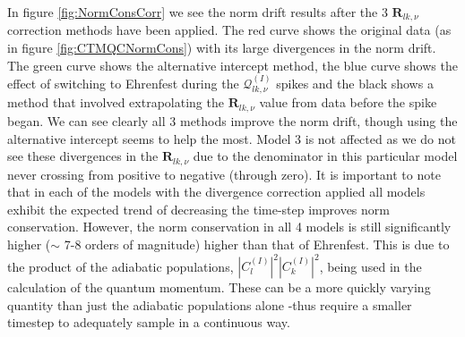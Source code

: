 In figure \ref{fig:NormConsCorr} we see the norm drift results after the 3 $\mathbf{R}_{lk, \nu}$ correction methods have been applied. The red curve shows the original data (as in figure \ref{fig:CTMQCNormCons}) with its large divergences in the norm drift. The green curve shows the alternative intercept method, the blue curve shows the effect of switching to Ehrenfest during the $\mathcal{Q}_{lk, \nu}^{(I)}$ spikes and the black shows a method that involved extrapolating the $\mathbf{R}_{lk, \nu}$ value from data before the spike began. We can see clearly all 3 methods improve the norm drift, though using the alternative intercept seems to help the most. Model 3 is not affected as we do not see these divergences in the $\mathbf{R}_{lk, \nu}$ due to the denominator in this particular model never crossing from positive to negative (through zero). It is important to note that in each of the models with the divergence correction applied all models exhibit the expected trend of decreasing the time-step improves norm conservation. However, the norm conservation in all 4 models is still significantly higher ($\sim$ 7-8 orders of magnitude) higher than that of Ehrenfest.  This is due to the product of the adiabatic populations, $|C_{l}^{(I)}|^2 |C_{k}^{(I)}|^2$, being used in the calculation of the quantum momentum. These can be a more quickly varying quantity than just the adiabatic populations alone -thus require a smaller timestep to adequately sample in a continuous way.

